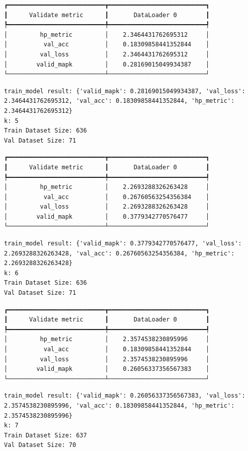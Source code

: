 \documentclass[
  letterpaper,
  DIV=11,
  numbers=noendperiod]{scrreprt}
\begin{document}
\begin{verbatim}
┏━━━━━━━━━━━━━━━━━━━━━━━━━━━┳━━━━━━━━━━━━━━━━━━━━━━━━━━━┓
┃      Validate metric      ┃       DataLoader 0        ┃
┡━━━━━━━━━━━━━━━━━━━━━━━━━━━╇━━━━━━━━━━━━━━━━━━━━━━━━━━━┩
│         hp_metric         │    2.3464431762695312     │
│          val_acc          │    0.18309858441352844    │
│         val_loss          │    2.3464431762695312     │
│        valid_mapk         │    0.28169015049934387    │
└───────────────────────────┴───────────────────────────┘
\end{verbatim}

\begin{verbatim}
train_model result: {'valid_mapk': 0.28169015049934387, 'val_loss': 2.3464431762695312, 'val_acc': 0.18309858441352844, 'hp_metric': 2.3464431762695312}
k: 5
Train Dataset Size: 636
Val Dataset Size: 71
\end{verbatim}

\begin{verbatim}
┏━━━━━━━━━━━━━━━━━━━━━━━━━━━┳━━━━━━━━━━━━━━━━━━━━━━━━━━━┓
┃      Validate metric      ┃       DataLoader 0        ┃
┡━━━━━━━━━━━━━━━━━━━━━━━━━━━╇━━━━━━━━━━━━━━━━━━━━━━━━━━━┩
│         hp_metric         │    2.2693288326263428     │
│          val_acc          │    0.26760563254356384    │
│         val_loss          │    2.2693288326263428     │
│        valid_mapk         │    0.3779342770576477     │
└───────────────────────────┴───────────────────────────┘
\end{verbatim}

\begin{verbatim}
train_model result: {'valid_mapk': 0.3779342770576477, 'val_loss': 2.2693288326263428, 'val_acc': 0.26760563254356384, 'hp_metric': 2.2693288326263428}
k: 6
Train Dataset Size: 636
Val Dataset Size: 71
\end{verbatim}

\begin{verbatim}
┏━━━━━━━━━━━━━━━━━━━━━━━━━━━┳━━━━━━━━━━━━━━━━━━━━━━━━━━━┓
┃      Validate metric      ┃       DataLoader 0        ┃
┡━━━━━━━━━━━━━━━━━━━━━━━━━━━╇━━━━━━━━━━━━━━━━━━━━━━━━━━━┩
│         hp_metric         │    2.3574538230895996     │
│          val_acc          │    0.18309858441352844    │
│         val_loss          │    2.3574538230895996     │
│        valid_mapk         │    0.26056337356567383    │
└───────────────────────────┴───────────────────────────┘
\end{verbatim}

\begin{verbatim}
train_model result: {'valid_mapk': 0.26056337356567383, 'val_loss': 2.3574538230895996, 'val_acc': 0.18309858441352844, 'hp_metric': 2.3574538230895996}
k: 7
Train Dataset Size: 637
Val Dataset Size: 70
\end{verbatim}
\end{document}

